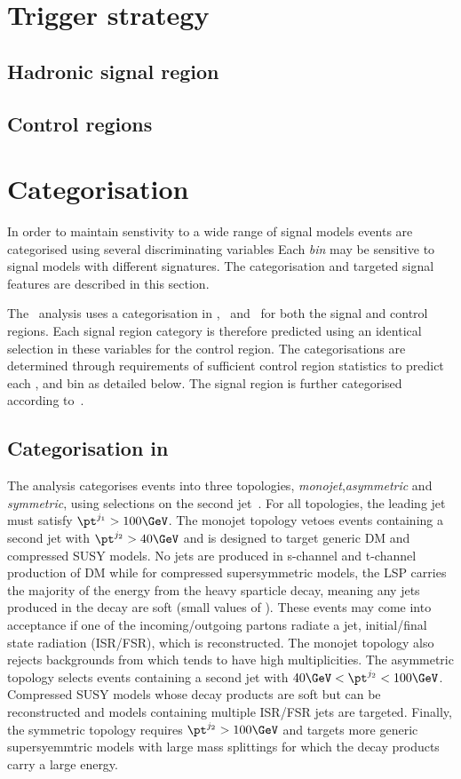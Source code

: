 \section{Trigger strategy}
\subsection{Hadronic signal region}
\subsection{Control regions}

\section{Categorisation}
\label{sec:cat}
In order to maintain senstivity to a wide range of signal models events are categorised using
several discriminating variables Each \emph{bin} may be sensitive to signal models with different 
signatures. The categorisation and targeted signal features are described in this section.

The \alphat~analysis uses a categorisation in \njet, \nb~and \scalht~for both 
the signal and control regions. Each signal region category is therefore predicted using an identical 
selection in these variables for the control region. The categorisations are determined through requirements of sufficient
control region statistics to predict each \njet, \nb and \scalht bin as detailed below. The signal region is 
further categorised according to~\mht. 

\subsection{Categorisation in \njet}

The \alphat analysis categorises events into three topologies, \emph{monojet},\emph{asymmetric} 
and \emph{symmetric}, using selections on the second jet~\pt. For all topologies, the leading
jet must satisfy $\pt^{j_1} > 100\GeV$.  The monojet topology vetoes events containing a second 
jet with $\pt^{j_2} > 40\GeV$ and is designed to target generic DM 
and compressed SUSY models. No jets are produced in s-channel and t-channel production of DM
while for compressed supersymmetric models, the LSP carries the majority of the energy from 
the heavy sparticle decay, meaning any jets produced in the decay are soft (small values of \pt). 
These events may come into acceptance if one of the incoming/outgoing partons radiate a jet, initial/final state
radiation (ISR/FSR), which is reconstructed. The monojet topology also rejects backgrounds from 
\ttbar which tends to have high \njet multiplicities. The asymmetric topology selects events 
containing a second jet with $40\GeV < \pt^{j_2} < 100\GeV$.
Compressed SUSY models whose decay products are soft but can be reconstructed and models
containing multiple ISR/FSR jets are targeted. Finally, the symmetric topology requires  
$\pt^{j_2} > 100\GeV$ and targets more generic supersyemmtric models with large mass splittings 
for which the decay products carry a large energy.

